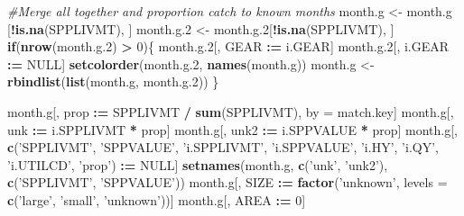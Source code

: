 \documentclass[]{article}
\newenvironment{Shaded}{\begin{snugshade}}{\end{snugshade}}
\newcommand{\KeywordTok}[1]{\textcolor[rgb]{0.13,0.29,0.53}{\textbf{#1}}}
\newcommand{\DataTypeTok}[1]{\textcolor[rgb]{0.13,0.29,0.53}{#1}}
\newcommand{\DecValTok}[1]{\textcolor[rgb]{0.00,0.00,0.81}{#1}}
\newcommand{\StringTok}[1]{\textcolor[rgb]{0.31,0.60,0.02}{#1}}
\newcommand{\CommentTok}[1]{\textcolor[rgb]{0.56,0.35,0.01}{\textit{#1}}}
\newcommand{\OtherTok}[1]{\textcolor[rgb]{0.56,0.35,0.01}{#1}}
\newcommand{\ControlFlowTok}[1]{\textcolor[rgb]{0.13,0.29,0.53}{\textbf{#1}}}
\newcommand{\OperatorTok}[1]{\textcolor[rgb]{0.81,0.36,0.00}{\textbf{#1}}}
\newcommand{\ErrorTok}[1]{\textcolor[rgb]{0.64,0.00,0.00}{\textbf{#1}}}
\newcommand{\NormalTok}[1]{#1}
\begin{document}
\begin{Shaded}
\begin{Highlighting}[]
  \CommentTok{#Merge all together and proportion catch to known months}
\NormalTok{  month.g   <-}\StringTok{ }\NormalTok{month.g  [}\OperatorTok{!}\KeywordTok{is.na}\NormalTok{(SPPLIVMT), ]}
\NormalTok{  month.g.}\DecValTok{2}\NormalTok{ <-}\StringTok{ }\NormalTok{month.g.}\DecValTok{2}\NormalTok{[}\OperatorTok{!}\KeywordTok{is.na}\NormalTok{(SPPLIVMT), ]}
  \ControlFlowTok{if}\NormalTok{(}\KeywordTok{nrow}\NormalTok{(month.g.}\DecValTok{2}\NormalTok{) }\OperatorTok{>}\StringTok{ }\DecValTok{0}\NormalTok{)\{}
\NormalTok{    month.g.}\DecValTok{2}\NormalTok{[, GEAR   }\OperatorTok{:}\ErrorTok{=}\StringTok{ }\NormalTok{i.GEAR]}
\NormalTok{    month.g.}\DecValTok{2}\NormalTok{[, i.GEAR }\OperatorTok{:}\ErrorTok{=}\StringTok{ }\OtherTok{NULL}\NormalTok{]}
    \KeywordTok{setcolorder}\NormalTok{(month.g.}\DecValTok{2}\NormalTok{, }\KeywordTok{names}\NormalTok{(month.g))}
\NormalTok{    month.g <-}\StringTok{ }\KeywordTok{rbindlist}\NormalTok{(}\KeywordTok{list}\NormalTok{(month.g, month.g.}\DecValTok{2}\NormalTok{))}
\NormalTok{    \}}
  
\NormalTok{  month.g[, prop }\OperatorTok{:}\ErrorTok{=}\StringTok{ }\NormalTok{SPPLIVMT }\OperatorTok{/}\StringTok{ }\KeywordTok{sum}\NormalTok{(SPPLIVMT), by =}\StringTok{ }\NormalTok{match.key]}
\NormalTok{  month.g[, unk  }\OperatorTok{:}\ErrorTok{=}\StringTok{ }\NormalTok{i.SPPLIVMT }\OperatorTok{*}\StringTok{ }\NormalTok{prop]}
\NormalTok{  month.g[, unk2 }\OperatorTok{:}\ErrorTok{=}\StringTok{ }\NormalTok{i.SPPVALUE }\OperatorTok{*}\StringTok{ }\NormalTok{prop]}
\NormalTok{  month.g[, }\KeywordTok{c}\NormalTok{(}\StringTok{'SPPLIVMT'}\NormalTok{, }\StringTok{'SPPVALUE'}\NormalTok{, }\StringTok{'i.SPPLIVMT'}\NormalTok{, }\StringTok{'i.SPPVALUE'}\NormalTok{, }\StringTok{'i.HY'}\NormalTok{, }\StringTok{'i.QY'}\NormalTok{, }
              \StringTok{'i.UTILCD'}\NormalTok{, }\StringTok{'prop'}\NormalTok{) }\OperatorTok{:}\ErrorTok{=}\StringTok{ }\OtherTok{NULL}\NormalTok{]}
  \KeywordTok{setnames}\NormalTok{(month.g, }\KeywordTok{c}\NormalTok{(}\StringTok{'unk'}\NormalTok{, }\StringTok{'unk2'}\NormalTok{), }\KeywordTok{c}\NormalTok{(}\StringTok{'SPPLIVMT'}\NormalTok{, }\StringTok{'SPPVALUE'}\NormalTok{))}
\NormalTok{  month.g[, SIZE }\OperatorTok{:}\ErrorTok{=}\StringTok{ }\KeywordTok{factor}\NormalTok{(}\StringTok{'unknown'}\NormalTok{, }\DataTypeTok{levels =} \KeywordTok{c}\NormalTok{(}\StringTok{'large'}\NormalTok{, }\StringTok{'small'}\NormalTok{, }\StringTok{'unknown'}\NormalTok{))]}
\NormalTok{  month.g[, AREA }\OperatorTok{:}\ErrorTok{=}\StringTok{ }\DecValTok{0}\NormalTok{]}
  

\end{Highlighting}
\end{Shaded}
\end{document}
